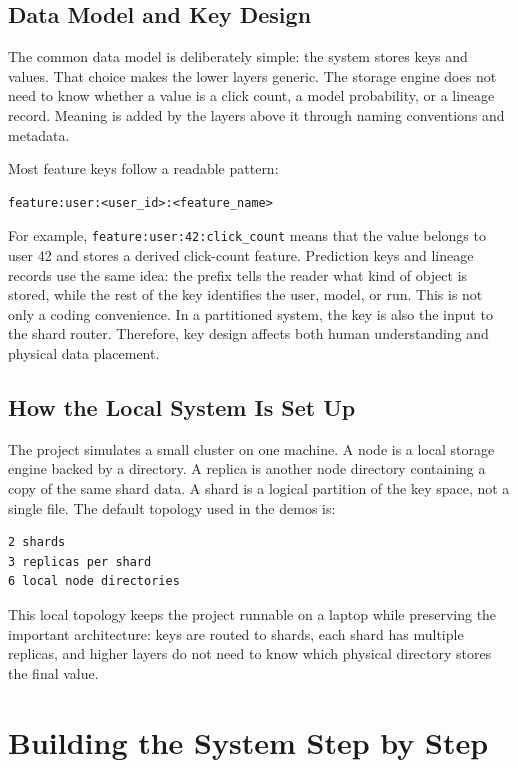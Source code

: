 \subsection{Data Model and Key Design}

The common data model is deliberately simple: the system stores keys and values.
That choice makes the lower layers generic. The storage engine does not need to
know whether a value is a click count, a model probability, or a lineage record.
Meaning is added by the layers above it through naming conventions and metadata.

Most feature keys follow a readable pattern:

\begin{lstlisting}
feature:user:<user_id>:<feature_name>
\end{lstlisting}

For example, \texttt{feature:user:42:click\_count} means that the value belongs
to user 42 and stores a derived click-count feature. Prediction keys and lineage
records use the same idea: the prefix tells the reader what kind of object is
stored, while the rest of the key identifies the user, model, or run. This is
not only a coding convenience. In a partitioned system, the key is also the
input to the shard router. Therefore, key design affects both human
understanding and physical data placement.

\subsection{How the Local System Is Set Up}

The project simulates a small cluster on one machine. A node is a local storage
engine backed by a directory. A replica is another node directory containing a
copy of the same shard data. A shard is a logical partition of the key space,
not a single file. The default topology used in the demos is:

\begin{lstlisting}
2 shards
3 replicas per shard
6 local node directories
\end{lstlisting}

This local topology keeps the project runnable on a laptop while preserving the
important architecture: keys are routed to shards, each shard has multiple
replicas, and higher layers do not need to know which physical directory stores
the final value.

\section{Building the System Step by Step}\label{sec:milestones}

